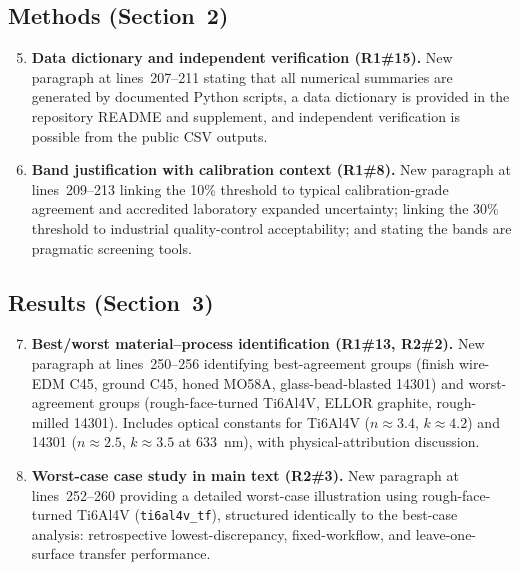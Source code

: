 \documentclass[10pt]{article}
\begin{document}
\subsection*{Methods (Section~2)}

\begin{enumerate}[leftmargin=*, label=\textbf{C\arabic*.}, ref=C\arabic*]
\setcounter{enumi}{4}

\item \textbf{Data dictionary and independent verification (R1\#15).} New paragraph at lines~207--211 stating that all numerical summaries are generated by documented Python scripts, a data dictionary is provided in the repository README and supplement, and independent verification is possible from the public CSV outputs.

\item \textbf{Band justification with calibration context (R1\#8).} New paragraph at lines~209--213 linking the 10\% threshold to typical calibration-grade agreement and accredited laboratory expanded uncertainty; linking the 30\% threshold to industrial quality-control acceptability; and stating the bands are pragmatic screening tools.

\end{enumerate}

\subsection*{Results (Section~3)}

\begin{enumerate}[leftmargin=*, label=\textbf{C\arabic*.}, ref=C\arabic*]
\setcounter{enumi}{6}

\item \textbf{Best/worst material--process identification (R1\#13, R2\#2).} New paragraph at lines~250--256 identifying best-agreement groups (finish wire-EDM C45, ground C45, honed MO58A, glass-bead-blasted 14301) and worst-agreement groups (rough-face-turned Ti6Al4V, ELLOR graphite, rough-milled 14301). Includes optical constants for Ti6Al4V ($n \approx 3.4$, $k \approx 4.2$) and 14301 ($n \approx 2.5$, $k \approx 3.5$ at 633~nm), with physical-attribution discussion.

\item \textbf{Worst-case case study in main text (R2\#3).} New paragraph at lines~252--260 providing a detailed worst-case illustration using rough-face-turned Ti6Al4V (\texttt{ti6al4v\_tf}), structured identically to the best-case analysis: retrospective lowest-discrepancy, fixed-workflow, and leave-one-surface transfer performance.

\end{enumerate}
\end{document}
